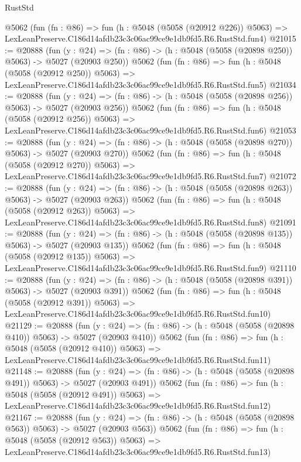 \begin{lexlean}{RustStd}
\begin{coremodule}
    @5062
    (fun (fn : @86) =>
    fun (h : @5048 (@5058 (@20912 @226)) @5063) =>
    LexLeanPreserve.C186d14afdb23c3c06ac99ce9e1db9fd5.R6.RustStd.fun4)
@21015 := @20888
    (fun (y : @24) => (fn : @86) -> (h : @5048 (@5058 (@20898 @250)) @5063) -> @5027 (@20903 @250))
    @5062
    (fun (fn : @86) =>
    fun (h : @5048 (@5058 (@20912 @250)) @5063) =>
    LexLeanPreserve.C186d14afdb23c3c06ac99ce9e1db9fd5.R6.RustStd.fun5)
@21034 := @20888
    (fun (y : @24) => (fn : @86) -> (h : @5048 (@5058 (@20898 @256)) @5063) -> @5027 (@20903 @256))
    @5062
    (fun (fn : @86) =>
    fun (h : @5048 (@5058 (@20912 @256)) @5063) =>
    LexLeanPreserve.C186d14afdb23c3c06ac99ce9e1db9fd5.R6.RustStd.fun6)
@21053 := @20888
    (fun (y : @24) => (fn : @86) -> (h : @5048 (@5058 (@20898 @270)) @5063) -> @5027 (@20903 @270))
    @5062
    (fun (fn : @86) =>
    fun (h : @5048 (@5058 (@20912 @270)) @5063) =>
    LexLeanPreserve.C186d14afdb23c3c06ac99ce9e1db9fd5.R6.RustStd.fun7)
@21072 := @20888
    (fun (y : @24) => (fn : @86) -> (h : @5048 (@5058 (@20898 @263)) @5063) -> @5027 (@20903 @263))
    @5062
    (fun (fn : @86) =>
    fun (h : @5048 (@5058 (@20912 @263)) @5063) =>
    LexLeanPreserve.C186d14afdb23c3c06ac99ce9e1db9fd5.R6.RustStd.fun8)
@21091 := @20888
    (fun (y : @24) => (fn : @86) -> (h : @5048 (@5058 (@20898 @135)) @5063) -> @5027 (@20903 @135))
    @5062
    (fun (fn : @86) =>
    fun (h : @5048 (@5058 (@20912 @135)) @5063) =>
    LexLeanPreserve.C186d14afdb23c3c06ac99ce9e1db9fd5.R6.RustStd.fun9)
@21110 := @20888
    (fun (y : @24) => (fn : @86) -> (h : @5048 (@5058 (@20898 @391)) @5063) -> @5027 (@20903 @391))
    @5062
    (fun (fn : @86) =>
    fun (h : @5048 (@5058 (@20912 @391)) @5063) =>
    LexLeanPreserve.C186d14afdb23c3c06ac99ce9e1db9fd5.R6.RustStd.fun10)
@21129 := @20888
    (fun (y : @24) => (fn : @86) -> (h : @5048 (@5058 (@20898 @410)) @5063) -> @5027 (@20903 @410))
    @5062
    (fun (fn : @86) =>
    fun (h : @5048 (@5058 (@20912 @410)) @5063) =>
    LexLeanPreserve.C186d14afdb23c3c06ac99ce9e1db9fd5.R6.RustStd.fun11)
@21148 := @20888
    (fun (y : @24) => (fn : @86) -> (h : @5048 (@5058 (@20898 @491)) @5063) -> @5027 (@20903 @491))
    @5062
    (fun (fn : @86) =>
    fun (h : @5048 (@5058 (@20912 @491)) @5063) =>
    LexLeanPreserve.C186d14afdb23c3c06ac99ce9e1db9fd5.R6.RustStd.fun12)
@21167 := @20888
    (fun (y : @24) => (fn : @86) -> (h : @5048 (@5058 (@20898 @563)) @5063) -> @5027 (@20903 @563))
    @5062
    (fun (fn : @86) =>
    fun (h : @5048 (@5058 (@20912 @563)) @5063) =>
    LexLeanPreserve.C186d14afdb23c3c06ac99ce9e1db9fd5.R6.RustStd.fun13)

\end{coremodule}
\end{lexlean}

